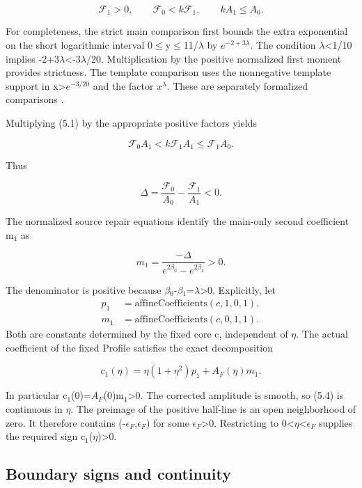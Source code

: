 \documentclass[11pt,a4paper]{article}
\begin{document}
\[
\mathcal F_1>0,\qquad \mathcal F_0<k\mathcal F_1,
\qquad kA_1\le A_0. \tag{5.1}
\]

For completeness, the strict main comparison first bounds the extra exponential on the short logarithmic interval 0\ensuremath{\le}y\ensuremath{\le}11/\ensuremath{\lambda} by \(e^{-2+3\lambda }\). The condition \ensuremath{\lambda}<1/10 implies -2+3\ensuremath{\lambda}<-3\ensuremath{\lambda}/20. Multiplication by the positive normalized first moment provides strictness. The template comparison uses the nonnegative template support in x>\(e^{-3/20}\) and the factor \(x^\lambda \). These are separately formalized comparisons \cite{ref2}.

Multiplying (5.1) by the appropriate positive factors yields

\[
\mathcal F_0A_1<k\mathcal F_1A_1\le\mathcal F_1A_0.
\]

Thus

\[
\Delta=\frac{\mathcal F_0}{A_0}-\frac{\mathcal F_1}{A_1}<0. \tag{5.2}
\]

The normalized source repair equations identify the main-only second coefficient m\ensuremath{{}_1} as

\[
m_1=\frac{-\Delta}{e^{2\beta_0}-e^{2\beta_1}}>0. \tag{5.3}
\]

The denominator is positive because \ensuremath{\beta}\ensuremath{{}_0}-\ensuremath{\beta}\ensuremath{{}_1}=\ensuremath{\lambda}>0. Explicitly, let
\[\begin{aligned}
p_1&=\mathrm{affineCoefficients}(c,1,0,1),\\
m_1&=\mathrm{affineCoefficients}(c,0,1,1).
\end{aligned}\]
Both are constants determined by the fixed core c, independent of \ensuremath{\eta}. The actual coefficient of the fixed Profile satisfies the exact decomposition

\[
c_1(\eta)=\eta(1+\eta^2)p_1+A_F(\eta)m_1. \tag{5.4}
\]

In particular c\ensuremath{{}_1}(0)=\(A_F\)(0)m\ensuremath{{}_1}>0. The corrected amplitude is smooth, so (5.4) is continuous in \ensuremath{\eta}. The preimage of the positive half-line is an open neighborhood of zero. It therefore contains (-\(\epsilon _F\),\(\epsilon _F\)) for some \(\epsilon _F\)>0. Restricting to 0<\ensuremath{\eta}<\(\epsilon _F\) supplies the required sign c\ensuremath{{}_1}(\ensuremath{\eta})>0.

\subsection{Boundary signs and continuity}
\end{document}
